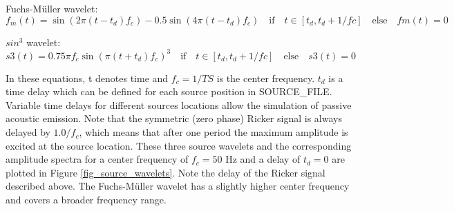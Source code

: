\documentclass{hitec}
\begin{document}
Fuchs-M\"uller wavelet:
\begin{equation}
f_m(t)=\sin(2\pi(t-t_d)f_c)-0.5\sin(4\pi(t-t_d)f_c) \quad \mbox{if} \quad t\in[t_d,t_d+1/fc] \quad \mbox{else} \quad fm(t)=0
\label{eq_fm}
\end{equation}

$sin^3$ wavelet:
\begin{equation}
s3(t)=0.75 \pi f_c \sin(\pi(t+t_d)f_c)^3\quad \mbox{if} \quad t \in[t_d,t_d+1/fc] \quad \mbox{else} \quad s3(t)=0
\label{eq_s3}
\end{equation}

In these equations, t denotes time and $f_c=1/TS$ is the center frequency. $t_d$ is a time delay which can be defined for each source position in SOURCE\_FILE. Variable time delays for different sources locations allow the simulation of passive acoustic emission. Note that the symmetric (zero phase) Ricker signal is always delayed by $1.0/f_c$, which means that after
one period the maximum amplitude is excited at the source location.  These three source wavelets and the corresponding amplitude spectra for a center frequency of $f_c=50$ Hz and
a delay of $t_d=0$ are plotted in Figure \ref{fig_source_wavelets}. Note the delay of the Ricker signal described above. The Fuchs-M\"uller wavelet has a slightly higher center frequency and covers a broader frequency range.
\end{document}
